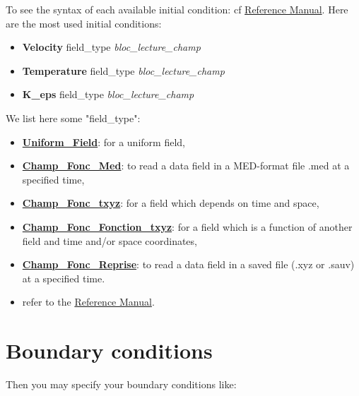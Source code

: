 To see the syntax of each available initial condition: cf \href{\REFERENCEMANUAL\#condinits}{\trustref Reference Manual}.
Here are the most used initial conditions:
\begin{itemize}
\item \textbf{Velocity}     field\_type   \textit{bloc\_lecture\_champ}
\item \textbf{Temperature}  field\_type   \textit{bloc\_lecture\_champ}
\item \textbf{K\_eps}       field\_type   \textit{bloc\_lecture\_champ}
\end{itemize}

We list here some "field\_type":
\begin{itemize}
\item \href{\REFERENCEMANUAL\#uniformfield}{\textbf{Uniform\_Field}}: for a uniform field,
\item \href{\REFERENCEMANUAL\#champfoncmed}{\textbf{Champ\_Fonc\_Med}}: to read a data field in a MED-format file .med at a specified time,
\item \href{\REFERENCEMANUAL\#fieldfunctxyz}{\textbf{Champ\_Fonc\_txyz}}: for a field which depends on time and space,
\item \href{\REFERENCEMANUAL\#champfoncfonctiontxyz}{\textbf{Champ\_Fonc\_Fonction\_txyz}}: for a field which is a function of another field and time and/or space coordinates,
\item \href{\REFERENCEMANUAL\#champfoncreprise}{\textbf{Champ\_Fonc\_Reprise}}: to read a data field in a saved file (.xyz or .sauv) at a specified time.
\item refer to the \href{\REFERENCEMANUAL\#fieldbase}{\trustref Reference Manual}.
\end{itemize}




\section{Boundary conditions}

Then you may specify your boundary conditions like:

